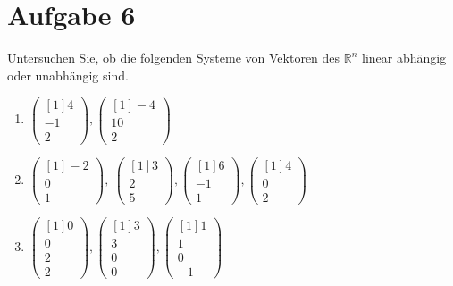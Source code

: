 \documentclass[main.tex]{subfiles}
\begin{document}
\arraycolsep=1pt %

\section{Aufgabe 6}

Untersuchen Sie, ob die folgenden Systeme von Vektoren des $\mathbb{R}^{n}$ linear abhängig oder unabhängig sind.

\begin{enumerate}
    \item $\begin{pmatrix}[1]
        4\\
        -1\\
        2
        \end{pmatrix} ,\begin{pmatrix}[1]
        -4\\
        10\\
        2
        \end{pmatrix}$
    \item  $\begin{pmatrix}[1]
        -2\\
        0\\
        1
        \end{pmatrix} ,\ \begin{pmatrix}[1]
        3\\
        2\\
        5
        \end{pmatrix} ,\begin{pmatrix}[1]
        6\\
        -1\\
        1
        \end{pmatrix} ,\begin{pmatrix}[1]
        4\\
        0\\
        2
        \end{pmatrix}$
    \item $\begin{pmatrix}[1]
        0\\
        0\\
        2\\
        2
        \end{pmatrix} ,\begin{pmatrix}[1]
        3\\
        3\\
        0\\
        0
        \end{pmatrix} ,\begin{pmatrix}[1]
        1\\
        1\\
        0\\
        -1
        \end{pmatrix}$
\end{enumerate}
\end{document}
